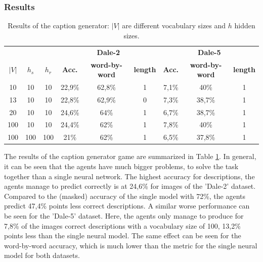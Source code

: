 \subsubsection*{Results}
\begin{table}[ht]
    \centering
    \begin{tabular}{ccc|ccc|ccc}
        \toprule
              &         &         & \multicolumn{3}{c}{\textbf{Dale-2}} & \multicolumn{3}{c}{\textbf{Dale-5}}                                                                             \\\cmidrule(lr){4-6}\cmidrule(lr){7-9}
        $|V|$ & $h_{s}$ & $h_{r}$ & \textbf{Acc.}                       & \textbf{word-by-word}               & \textbf{length} & \textbf{Acc.} & \textbf{word-by-word} & \textbf{length} \\\midrule
        {10}  & {10}    & {10}    & {22,9\%}                            & {62,8\%}                            & {1}             & {7,1\%}       & {40\%}                & {1}             \\
        {13}  & {10}    & {10}    & {22,8\%}                            & {62,9\%}                            & {0}             & {7,3\%}       & {38,7\%}              & {1}             \\
        {20}  & {10}    & {10}    & {24,6\%}                            & {64\%}                              & {1}             & {6,7\%}       & {38,7\%}              & {1}             \\
        {100} & {10}    & {10}    & {24,4\%}                            & {62\%}                              & {1}             & {7,8\%}       & {40\%}                & {1}             \\
        {100} & {100}   & {100}   & {21\%}                              & {62\%}                              & {1}             & {6,5\%}       & {37,8\%}              & {1}             \\
        \bottomrule
    \end{tabular}
    \caption{Results of the caption generator: $|V|$ are different vocabulary sizes and $h$ hidden sizes.}
    \label{tab:results_caption_generator_game}
\end{table}

The results of the caption generator game are summarized in Table \ref{tab:results_caption_generator_game}.
In general, it can be seen that the agents have much bigger problems, to solve the task together than a single neural network.
The highest accuracy for descriptions, the agents manage to predict correctly is at 24,6\% for images of the 'Dale-2' dataset.
Compared to the (masked) accuracy of the single model with 72\%, the agents predict 47,4\% points less correct descriptions.
A similar worse performance can be seen for the 'Dale-5' dataset.
Here, the agents only manage to produce for 7,8\% of the images correct descriptions with a vocabulary size of 100, 13,2\% points less than the single neural model.
The same effect can be seen for the word-by-word accuracy, which is much lower than the metric for the single neural model for both datasets.


